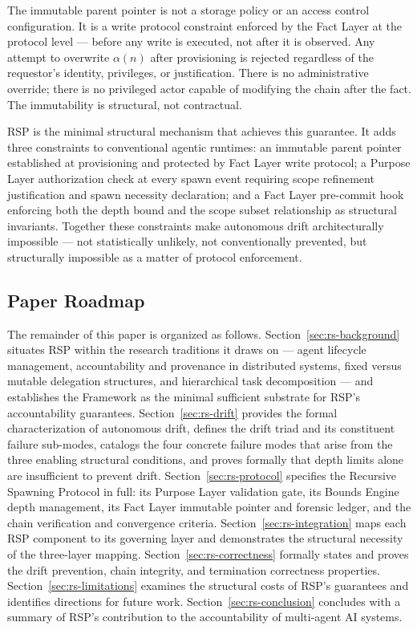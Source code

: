 The immutable parent pointer is not a storage policy or an access control configuration. It is a write protocol constraint enforced by the Fact Layer at the protocol level — before any write is executed, not after it is observed. Any attempt to overwrite $\alpha(n)$ after provisioning is rejected regardless of the requestor's identity, privileges, or justification. There is no administrative override; there is no privileged actor capable of modifying the chain after the fact. The immutability is structural, not contractual.

RSP is the minimal structural mechanism that achieves this guarantee. It adds three constraints to conventional agentic runtimes: an immutable parent pointer established at provisioning and protected by Fact Layer write protocol; a Purpose Layer authorization check at every spawn event requiring scope refinement justification and spawn necessity declaration; and a Fact Layer pre-commit hook enforcing both the depth bound and the scope subset relationship as structural invariants. Together these constraints make autonomous drift architecturally impossible — not statistically unlikely, not conventionally prevented, but structurally impossible as a matter of protocol enforcement.

\subsection{Paper Roadmap}

The remainder of this paper is organized as follows. Section~\ref{sec:rs-background} situates RSP within the research traditions it draws on — agent lifecycle management, accountability and provenance in distributed systems, fixed versus mutable delegation structures, and hierarchical task decomposition — and establishes the \bxthree Framework as the minimal sufficient substrate for RSP's accountability guarantees. Section~\ref{sec:rs-drift} provides the formal characterization of autonomous drift, defines the drift triad and its constituent failure sub-modes, catalogs the four concrete failure modes that arise from the three enabling structural conditions, and proves formally that depth limits alone are insufficient to prevent drift. Section~\ref{sec:rs-protocol} specifies the Recursive Spawning Protocol in full: its Purpose Layer validation gate, its Bounds Engine depth management, its Fact Layer immutable pointer and forensic ledger, and the chain verification and convergence criteria. Section~\ref{sec:rs-integration} maps each RSP component to its governing \bxthree layer and demonstrates the structural necessity of the three-layer mapping. Section~\ref{sec:rs-correctness} formally states and proves the drift prevention, chain integrity, and termination correctness properties. Section~\ref{sec:rs-limitations} examines the structural costs of RSP's guarantees and identifies directions for future work. Section~\ref{sec:rs-conclusion} concludes with a summary of RSP's contribution to the accountability of multi-agent AI systems.